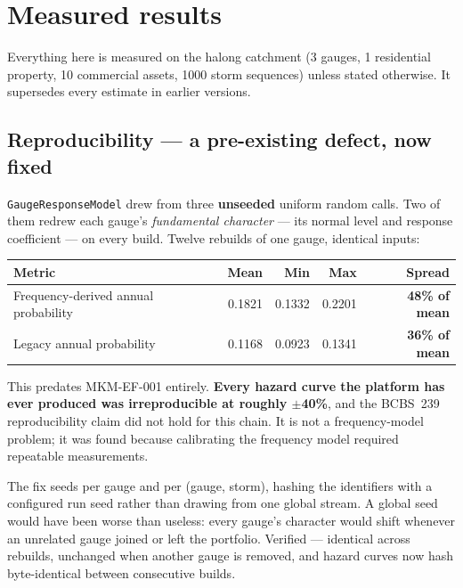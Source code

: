 \documentclass[11pt]{article}
\begin{document}
\section{Measured results}
\label{sec:measured}

Everything here is measured on the halong catchment (3 gauges, 1 residential
property, 10 commercial assets, 1000 storm sequences) unless stated otherwise.
It supersedes every estimate in earlier versions.

\subsection{Reproducibility --- a pre-existing defect, now fixed}
\label{sec:repro}

\texttt{GaugeResponseModel} drew from three \textbf{unseeded} uniform random
calls. Two of them redrew each gauge's \emph{fundamental character} --- its
normal level and response coefficient --- on every build. Twelve rebuilds of one
gauge, identical inputs:

\begin{center}
\begin{tabular}{@{}lrrrr@{}}
\toprule
\textbf{Metric} & \textbf{Mean} & \textbf{Min} & \textbf{Max} & \textbf{Spread} \\
\midrule
Frequency-derived annual probability & 0.1821 & 0.1332 & 0.2201 & \textbf{48\% of mean} \\
Legacy annual probability & 0.1168 & 0.0923 & 0.1341 & \textbf{36\% of mean} \\
\bottomrule
\end{tabular}
\end{center}

\noindent This predates MKM-EF-001 entirely. \textbf{Every hazard curve the
platform has ever produced was irreproducible at roughly $\pm$40\%}, and the
BCBS~239 reproducibility claim did not hold for this chain. It is not a
frequency-model problem; it was found because calibrating the frequency model
required repeatable measurements.

The fix seeds per gauge and per (gauge, storm), hashing the identifiers with a
configured run seed rather than drawing from one global stream. A global seed
would have been worse than useless: every gauge's character would shift whenever
an unrelated gauge joined or left the portfolio. Verified --- identical across
rebuilds, unchanged when another gauge is removed, and hazard curves now hash
byte-identical between consecutive builds.
\end{document}
